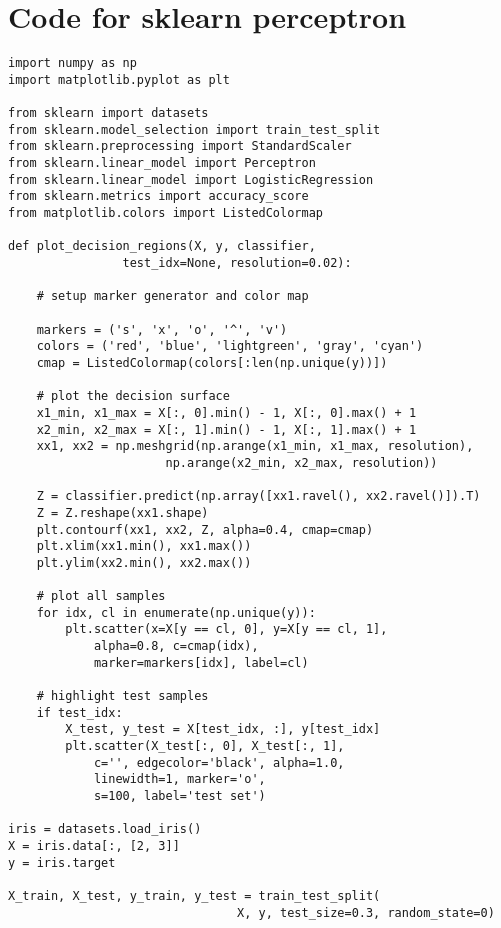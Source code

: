 \documentclass[12pt]{article}
\begin{document}
\section{Code for sklearn perceptron}
\begin{verbatim}
import numpy as np 
import matplotlib.pyplot as plt

from sklearn import datasets 
from sklearn.model_selection import train_test_split
from sklearn.preprocessing import StandardScaler
from sklearn.linear_model import Perceptron
from sklearn.linear_model import LogisticRegression
from sklearn.metrics import accuracy_score
from matplotlib.colors import ListedColormap

def plot_decision_regions(X, y, classifier,                     
                test_idx=None, resolution=0.02):    
    
    # setup marker generator and color map

    markers = ('s', 'x', 'o', '^', 'v')    
    colors = ('red', 'blue', 'lightgreen', 'gray', 'cyan')    
    cmap = ListedColormap(colors[:len(np.unique(y))])    
    
    # plot the decision surface    
    x1_min, x1_max = X[:, 0].min() - 1, X[:, 0].max() + 1    
    x2_min, x2_max = X[:, 1].min() - 1, X[:, 1].max() + 1    
    xx1, xx2 = np.meshgrid(np.arange(x1_min, x1_max, resolution),       
                      np.arange(x2_min, x2_max, resolution))    
                      
    Z = classifier.predict(np.array([xx1.ravel(), xx2.ravel()]).T)    
    Z = Z.reshape(xx1.shape)    
    plt.contourf(xx1, xx2, Z, alpha=0.4, cmap=cmap)    
    plt.xlim(xx1.min(), xx1.max())    
    plt.ylim(xx2.min(), xx2.max())    
    
    # plot all samples    
    for idx, cl in enumerate(np.unique(y)):        
        plt.scatter(x=X[y == cl, 0], y=X[y == cl, 1],                    
            alpha=0.8, c=cmap(idx),                    
            marker=markers[idx], label=cl)

    # highlight test samples    
    if test_idx:        
        X_test, y_test = X[test_idx, :], y[test_idx]           
        plt.scatter(X_test[:, 0], X_test[:, 1], 
            c='', edgecolor='black', alpha=1.0, 
            linewidth=1, marker='o',                 
            s=100, label='test set')

iris = datasets.load_iris()
X = iris.data[:, [2, 3]]
y = iris.target

X_train, X_test, y_train, y_test = train_test_split(
                                X, y, test_size=0.3, random_state=0)


\end{verbatim}
\end{document}
